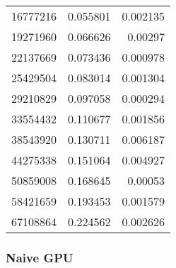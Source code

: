 \begin{longtable}{r r r}
16777216 & 0.055801 & 0.002135 \\
19271960 & 0.066626 & 0.00297 \\
22137669 & 0.073436 & 0.000978 \\
25429504 & 0.083014 & 0.001304 \\
29210829 & 0.097058 & 0.000294 \\
33554432 & 0.110677 & 0.001856 \\
38543920 & 0.130711 & 0.006187 \\
44275338 & 0.151064 & 0.004927 \\
50859008 & 0.168645 & 0.00053 \\
58421659 & 0.193453 & 0.001579 \\
67108864 & 0.224562 & 0.002626 \\
\end{longtable}

\subsubsection{Naive GPU}

